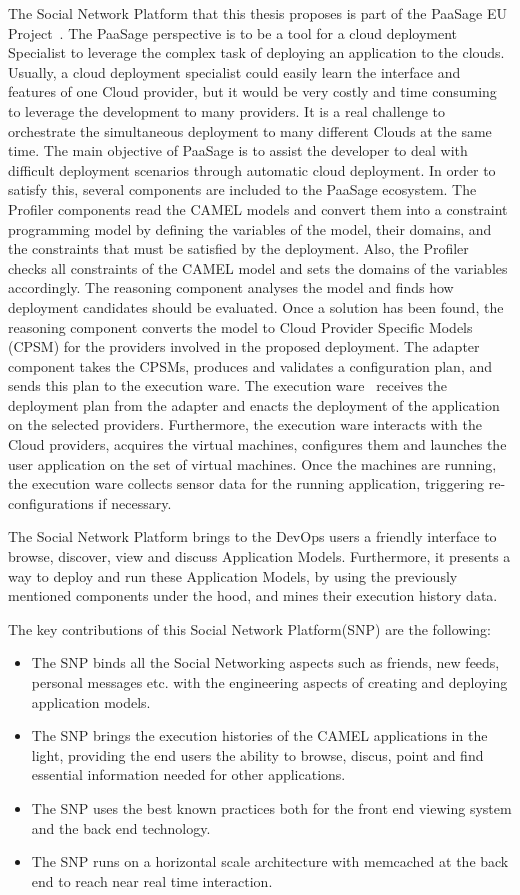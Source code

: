 The Social Network Platform that this thesis proposes is part of the PaaSage EU Project~\cite{paasage}.
The PaaSage perspective is to be a tool for a cloud deployment Specialist to leverage the complex task of deploying an application to the clouds. Usually, a cloud deployment specialist could easily learn the interface and features of one Cloud provider, but it would be very costly and time consuming to leverage the development to many providers. It is a real challenge to orchestrate the simultaneous deployment to many different Clouds at the same time. The main objective of PaaSage is to assist the developer to deal with difficult deployment scenarios through automatic cloud deployment. In order to satisfy this, several components are included to the PaaSage ecosystem. The Profiler components read the CAMEL models and convert them into a constraint programming model by defining the variables of the model, their domains, and the constraints that must be satisfied by the deployment. Also, the Profiler checks all constraints of the CAMEL model and sets the domains of the variables accordingly. The reasoning component analyses the model and finds how deployment candidates should be evaluated. Once a solution has been found, the reasoning component converts the model to Cloud Provider Specific Models (CPSM) for the providers involved in the proposed deployment. The adapter component takes the CPSMs, produces and validates a configuration plan, and sends this plan to the execution ware. The execution ware~\cite{baur2014towards} receives the deployment plan from the adapter and enacts the deployment of the application on the selected providers. Furthermore, the execution ware interacts with the Cloud providers, acquires the virtual machines, configures them and launches the user application on the set of virtual machines. Once the machines are running, the execution ware collects sensor data for the running application, triggering re-configurations if necessary.

The Social Network Platform brings to the DevOps users a friendly interface to browse, discover, view and discuss Application Models. Furthermore, it presents a way to deploy and run these Application Models, by using the previously mentioned components under the hood, and mines their execution history data.

The key contributions of this Social Network Platform(SNP) are the following:
\begin{itemize}
\item The SNP binds all the Social Networking aspects such as friends, new feeds, personal messages etc. with the engineering aspects of creating and deploying application models.
\item The SNP brings the execution histories of the CAMEL applications in the light, providing the end users the ability to browse, discus, point and find essential information needed for other applications.
\item The SNP uses the best known practices both for the front end viewing system and the back end technology.
\item The SNP runs on a horizontal scale architecture with memcached at the back end to reach near real time interaction. 
\end{itemize}


